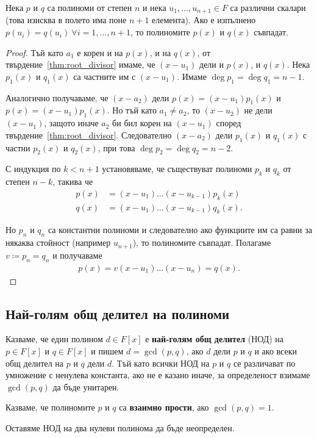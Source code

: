 \documentclass[numbers=endperiod, bibliography=totocnumbered]{scrartcl}
\begin{document}
\begin{theorem}\label{thm:coefficient_comparison_principle}
  Нека \( p \) и \( q \) са полиноми от степен \( n \) и нека \( u_1, \ldots, u_{n+1} \in F \) са различни скалари (това изисква в полето има поне \( n+1 \) елемента). Ако е изпълнено \( p(u_i) = q(u_i)~\forall i = 1, \ldots, n + 1 \), то полиномите \( p(x) \) и \( q(x) \) съвпадат.
\end{theorem}
\begin{proof}
  Тъй като \( a_1 \) е корен и на \( p(x) \), и на \( q(x) \), от твърдение~\ref{thm:root_divisor} имаме, че \( (x - u_1) \) дели и \( p(x) \), и \( q(x) \). Нека \( p_1(x) \) и \( q_1(x) \) са частните им с \( (x - u_1) \). Имаме \( \deg p_1 = \deg q_1 = n - 1 \).

  Аналогично получаваме, че \( (x - a_2) \) дели \( p(x) = (x - u_1) p_1(x) \) и \( p(x) = (x - u_1) p_1(x) \). Но тъй като \( a_1 \neq a_2 \), то \( (x - u_2) \) не дели \( (x - u_1) \), защото иначе \( a_2 \) би бил корен на \( (x - u_1) \) според твърдение~\ref{thm:root_divisor}. Следователно \( (x - a_2) \) дели \( p_1(x) \) и \( q_1(x) \) с частни \( p_2(x) \) и \( q_2(x) \), при това \( \deg p_2 = \deg q_2 = n - 2 \).

  С индукция по \( k < n + 1 \) установяваме, че съществуват полиноми \( p_k \) и \( q_k \) от степен \( n - k \), такива че
  \begin{align*}
    p(x) &= (x - u_1) \ldots (x - u_{k-1}) p_k(x) \\
    q(x) &= (x - u_1) \ldots (x - u_{k-1}) q_k(x).
  \end{align*}

  Но \( p_n \) и \( q_n \) са константни полиноми и следователно ако функциите им са равни за някаква стойност (например \( u_{n+1} \)), то полиномите съвпадат. Полагаме \( v \coloneqq p_n = q_n \) и получаваме
  \begin{align*}
    p(x) = v (x - u_1) \ldots (x - u_n) = q(x).
  \end{align*}
\end{proof}

\subsection{Най-голям общ делител на полиноми}

\begin{definition}
  Казваме, че един полином \( d \in F[x] \) е \textbf{най-голям общ делител} (НОД) на \( p \in F[x] \) и \( q \in F[x] \) и пишем \( d = \gcd(p, q) \), ако \( d \) дели \( p \) и \( q \) и ако всеки общ делител на \( p \) и \( q \) дели \( d \). Тъй като всички НОД на \( p \) и \( q \) се различават по умножение с ненулева константа, ако не е казано иначе, за определеност взимаме \( \gcd(p, q) \) да бъде унитарен.

  Казваме, че полиномите \( p \) и \( q \) са \textbf{взаимно прости}, ако \( \gcd(p, q) = 1 \).

  Оставяме НОД на два нулеви полинома да бъде неопределен.
\end{definition}
\end{document}
